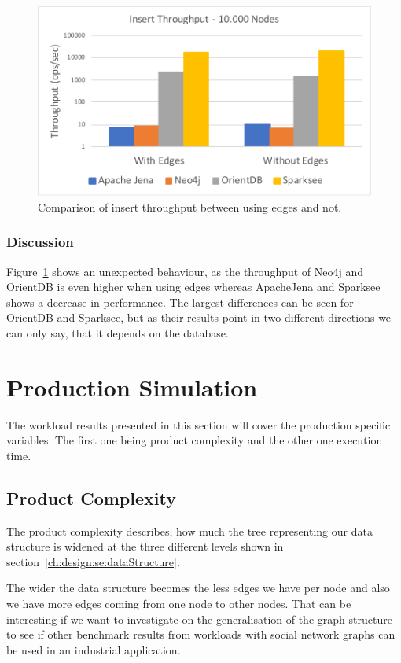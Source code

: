 \begin{figure}[h!]
  \centering
  \includegraphics[width=.75\textwidth]{images/throughput/indexNoEdges10000Nodes}
  \caption{Comparison of insert throughput between using edges and not.}
  \label{fig:indexNoEdges10000Nodes}
\end{figure}

\subsubsection{Discussion}
\label{ch:evaluation:se:edgeDiscussion}
Figure~\ref{fig:indexNoEdges10000Nodes} shows an unexpected behaviour,
as the throughput of Neo4j and OrientDB is even higher when using edges whereas ApacheJena and Sparksee shows a decrease in performance.
The largest differences can be seen for OrientDB and Sparksee,
but as their results point in two different directions we can only say,
that it depends on the database.

\section{Production Simulation}
\label{ch:evaluation:se:productionSimulation}
The workload results presented in this section will cover the production specific variables.
The first one being product complexity and the other one execution time.

\subsection{Product Complexity}
\label{ch:evaluation:se:productComplexity}
The product complexity describes,
how much the tree representing our data structure is widened at the three different levels shown in section~\ref{ch:design:se:dataStructure}.

The wider the data structure becomes the less edges we have per node and also we have more edges coming from one node to other nodes.
That can be interesting if we want to investigate on the generalisation of the graph structure to see if other benchmark results from workloads with social network graphs can be used in an industrial application.

